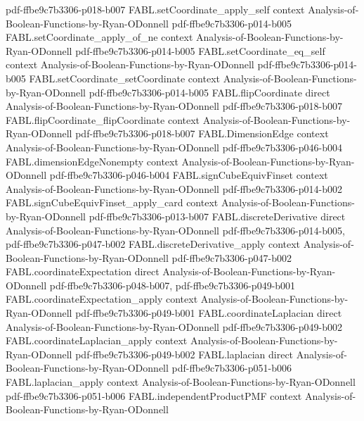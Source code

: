 \begin{theorem}
{    pdf-ffbe9c7b3306-p018-b007}
\proofstep
  {FABL.setCoordinate_apply_self}
  {context}
  {Analysis-of-Boolean-Functions-by-Ryan-ODonnell}
  {pdf-ffbe9c7b3306-p014-b005}
\proofstep
  {FABL.setCoordinate_apply_of_ne}
  {context}
  {Analysis-of-Boolean-Functions-by-Ryan-ODonnell}
  {pdf-ffbe9c7b3306-p014-b005}
\proofstep
  {FABL.setCoordinate_eq_self}
  {context}
  {Analysis-of-Boolean-Functions-by-Ryan-ODonnell}
  {pdf-ffbe9c7b3306-p014-b005}
\proofstep
  {FABL.setCoordinate_setCoordinate}
  {context}
  {Analysis-of-Boolean-Functions-by-Ryan-ODonnell}
  {pdf-ffbe9c7b3306-p014-b005}
\proofstep
  {FABL.flipCoordinate}
  {direct}
  {Analysis-of-Boolean-Functions-by-Ryan-ODonnell}
  {pdf-ffbe9c7b3306-p018-b007}
\proofstep
  {FABL.flipCoordinate_flipCoordinate}
  {context}
  {Analysis-of-Boolean-Functions-by-Ryan-ODonnell}
  {pdf-ffbe9c7b3306-p018-b007}
\proofstep
  {FABL.DimensionEdge}
  {context}
  {Analysis-of-Boolean-Functions-by-Ryan-ODonnell}
  {pdf-ffbe9c7b3306-p046-b004}
\proofstep
  {FABL.dimensionEdgeNonempty}
  {context}
  {Analysis-of-Boolean-Functions-by-Ryan-ODonnell}
  {pdf-ffbe9c7b3306-p046-b004}
\proofstep
  {FABL.signCubeEquivFinset}
  {context}
  {Analysis-of-Boolean-Functions-by-Ryan-ODonnell}
  {pdf-ffbe9c7b3306-p014-b002}
\proofstep
  {FABL.signCubeEquivFinset_apply_card}
  {context}
  {Analysis-of-Boolean-Functions-by-Ryan-ODonnell}
  {pdf-ffbe9c7b3306-p013-b007}
\proofstep
  {FABL.discreteDerivative}
  {direct}
  {Analysis-of-Boolean-Functions-by-Ryan-ODonnell}
  {pdf-ffbe9c7b3306-p014-b005,
    pdf-ffbe9c7b3306-p047-b002}
\proofstep
  {FABL.discreteDerivative_apply}
  {context}
  {Analysis-of-Boolean-Functions-by-Ryan-ODonnell}
  {pdf-ffbe9c7b3306-p047-b002}
\proofstep
  {FABL.coordinateExpectation}
  {direct}
  {Analysis-of-Boolean-Functions-by-Ryan-ODonnell}
  {pdf-ffbe9c7b3306-p048-b007,
    pdf-ffbe9c7b3306-p049-b001}
\proofstep
  {FABL.coordinateExpectation_apply}
  {context}
  {Analysis-of-Boolean-Functions-by-Ryan-ODonnell}
  {pdf-ffbe9c7b3306-p049-b001}
\proofstep
  {FABL.coordinateLaplacian}
  {direct}
  {Analysis-of-Boolean-Functions-by-Ryan-ODonnell}
  {pdf-ffbe9c7b3306-p049-b002}
\proofstep
  {FABL.coordinateLaplacian_apply}
  {context}
  {Analysis-of-Boolean-Functions-by-Ryan-ODonnell}
  {pdf-ffbe9c7b3306-p049-b002}
\proofstep
  {FABL.laplacian}
  {direct}
  {Analysis-of-Boolean-Functions-by-Ryan-ODonnell}
  {pdf-ffbe9c7b3306-p051-b006}
\proofstep
  {FABL.laplacian_apply}
  {context}
  {Analysis-of-Boolean-Functions-by-Ryan-ODonnell}
  {pdf-ffbe9c7b3306-p051-b006}
\proofstep
  {FABL.independentProductPMF}
  {context}
  {Analysis-of-Boolean-Functions-by-Ryan-ODonnell}

\end{theorem}
